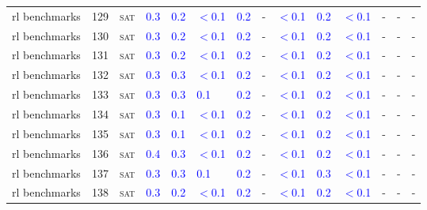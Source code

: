 \begin{center}
{\begin{longtable}{@{}llllllllllllll@{}}
rl benchmarks & 129 & \textsc{sat} & \textcolor{blue}{0.3} & \textcolor{blue}{0.2} & \textcolor{blue}{$<$0.1} & \textcolor{blue}{0.2} & - & \textcolor{blue}{$<$0.1} & \textcolor{blue}{0.2} & \textcolor{blue}{$<$0.1} & - & - & - \\
rl benchmarks & 130 & \textsc{sat} & \textcolor{blue}{0.3} & \textcolor{blue}{0.2} & \textcolor{blue}{$<$0.1} & \textcolor{blue}{0.2} & - & \textcolor{blue}{$<$0.1} & \textcolor{blue}{0.2} & \textcolor{blue}{$<$0.1} & - & - & - \\
rl benchmarks & 131 & \textsc{sat} & \textcolor{blue}{0.3} & \textcolor{blue}{0.2} & \textcolor{blue}{$<$0.1} & \textcolor{blue}{0.2} & - & \textcolor{blue}{$<$0.1} & \textcolor{blue}{0.2} & \textcolor{blue}{$<$0.1} & - & - & - \\
rl benchmarks & 132 & \textsc{sat} & \textcolor{blue}{0.3} & \textcolor{blue}{0.3} & \textcolor{blue}{$<$0.1} & \textcolor{blue}{0.2} & - & \textcolor{blue}{$<$0.1} & \textcolor{blue}{0.2} & \textcolor{blue}{$<$0.1} & - & - & - \\
rl benchmarks & 133 & \textsc{sat} & \textcolor{blue}{0.3} & \textcolor{blue}{0.3} & \textcolor{blue}{0.1} & \textcolor{blue}{0.2} & - & \textcolor{blue}{$<$0.1} & \textcolor{blue}{0.2} & \textcolor{blue}{$<$0.1} & - & - & - \\
rl benchmarks & 134 & \textsc{sat} & \textcolor{blue}{0.3} & \textcolor{blue}{0.1} & \textcolor{blue}{$<$0.1} & \textcolor{blue}{0.2} & - & \textcolor{blue}{$<$0.1} & \textcolor{blue}{0.2} & \textcolor{blue}{$<$0.1} & - & - & - \\
rl benchmarks & 135 & \textsc{sat} & \textcolor{blue}{0.3} & \textcolor{blue}{0.1} & \textcolor{blue}{$<$0.1} & \textcolor{blue}{0.2} & - & \textcolor{blue}{$<$0.1} & \textcolor{blue}{0.2} & \textcolor{blue}{$<$0.1} & - & - & - \\
rl benchmarks & 136 & \textsc{sat} & \textcolor{blue}{0.4} & \textcolor{blue}{0.3} & \textcolor{blue}{$<$0.1} & \textcolor{blue}{0.2} & - & \textcolor{blue}{$<$0.1} & \textcolor{blue}{0.2} & \textcolor{blue}{$<$0.1} & - & - & - \\
rl benchmarks & 137 & \textsc{sat} & \textcolor{blue}{0.3} & \textcolor{blue}{0.3} & \textcolor{blue}{0.1} & \textcolor{blue}{0.2} & - & \textcolor{blue}{$<$0.1} & \textcolor{blue}{0.3} & \textcolor{blue}{$<$0.1} & - & - & - \\
rl benchmarks & 138 & \textsc{sat} & \textcolor{blue}{0.3} & \textcolor{blue}{0.2} & \textcolor{blue}{$<$0.1} & \textcolor{blue}{0.2} & - & \textcolor{blue}{$<$0.1} & \textcolor{blue}{0.2} & \textcolor{blue}{$<$0.1} & - & - & - \\

\end{longtable}}
\end{center}
